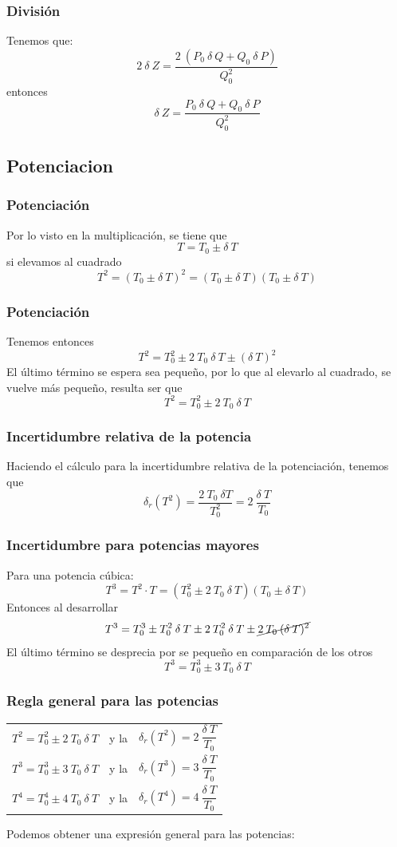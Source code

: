 \begin{frame}
\frametitle{División}
Tenemos que:
\[ 2 \: \delta \: Z = \dfrac{2 \: (P_{0} \: \delta \: Q + Q_{0} \: \delta \: P)}{Q_{0}^{2}} \]
entonces
\[ \delta \: Z = \dfrac{P_{0} \: \delta \: Q + Q_{0} \: \delta \: P}{Q_{0}^{2}} \]
\end{frame}
\subsection*{Potenciacion}
\begin{frame}
\frametitle{Potenciación}
Por lo visto en la multiplicación, se tiene que
\[ T = T_{0} \pm \delta \: T \]
si elevamos al cuadrado
\[ T^{2} = (T_{0} \pm \delta \: T)^{2} = (T_{0} \pm \delta \: T)(T_{0} \pm \delta \: T) \]
\end{frame}
\begin{frame}
\frametitle{Potenciación}
Tenemos entonces
\[ T^{2} = T_{0}^{2} \pm 2 \: T_{0} \: \delta \: T \pm (\delta \: T)^{2} \]
\pause
El último término se espera sea pequeño, por lo que al elevarlo al cuadrado, se vuelve más pequeño, resulta ser que
\[ T^{2} = T_{0}^{2} \pm 2 \: T_{0} \: \delta \: T \]
\end{frame}
\begin{frame}
\frametitle{Incertidumbre relativa de la potencia}
Haciendo el cálculo para la incertidumbre relativa de la potenciación, tenemos que
\[ \delta_{r} (T^{2}) = \dfrac{2 \: T_{0} \: \delta T}{T_{0}^{2}} = 2 \: \dfrac{\delta \: T}{T_{0}} \]
\end{frame}
\begin{frame}
\frametitle{Incertidumbre para potencias mayores}
Para una potencia cúbica:
\[ T^{3} = T^{2} \cdot T = (T_{0}^{2} \pm 2 \: T_{0} \: \delta \: T)(T_{0} \pm \delta \: T) \]
\pause
Entonces al desarrollar
\[ T^{3} =  T_{0}^{3} \pm T_{0}^{2} \: \delta \: T \pm 2 \: T_{0}^{2} \: \delta \: T \pm \cancel{2 \: T_{0} \: (\delta \: T)^{2}} \]
\pause
El último término se desprecia por se pequeño en comparación de los otros
\[ T^{3} = T_{0}^{3} \pm 3 \: T_{0} \: \delta \: T \]
\end{frame}
\begin{frame}
\frametitle{Regla general para las potencias}
\begin{tabular}{l c l}
$T^{2} = T_{0}^{2} \pm 2 \: T_{0} \: \delta \: T$ & y la & $\delta_{r} (T^{2}) = 2 \: \dfrac{\delta \: T}{T_{0}}$ \\[1em]
$T^{3} =T_{0}^{3} \pm 3 \: T_{0} \: \delta \: T$ 
 & y la & $\delta_{r} (T^{3}) = 3 \: \dfrac{\delta \: T}{T_{0}}$ \\[1em]
 $T^{4} =T_{0}^{4} \pm 4 \: T_{0} \: \delta \: T$ 
& y la & $\delta_{r} (T^{4}) = 4 \: \dfrac{\delta \: T}{T_{0}}$ \\[1em]
\end{tabular}
Podemos obtener una expresión general para las potencias:
\end{frame}
